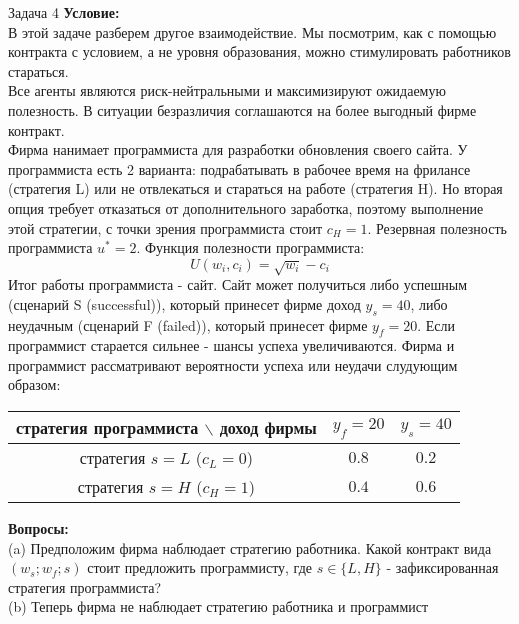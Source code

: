 \begin{mybox}{Задача 4}
    \indent\setlength{\parindent}{1em}\textbf{Условие:}\\
    \indent\setlength{\parindent}{1em}В этой задаче разберем другое взаимодействие. Мы посмотрим, как с помощью контракта с условием, а не уровня
    образования, можно стимулировать работников стараться.\\
    \indent\setlength{\parindent}{1em}Все агенты являются риск-нейтральными и максимизируют ожидаемую полезность. В ситуации безразличия соглашаются на
    более выгодный фирме контракт.\\
    \indent\setlength{\parindent}{1em}Фирма нанимает программиста для разработки обновления своего сайта. У
    программиста есть 2 варианта: подрабатывать в
    рабочее время на фрилансе (стратегия L) или не отвлекаться и стараться на работе (стратегия H). Но вторая опция
    требует отказаться от дополнительного заработка, поэтому выполнение этой стратегии, с точки зрения программиста
    стоит $c_H=1$. Резервная полезность программиста $u^*=2$. Функция полезности программиста: $$U(w_i,c_i)=\sqrt{w_i}
    -c_i$$
    \indent\setlength{\parindent}{1em}Итог работы программиста - сайт. Сайт может получиться либо успешным (сценарий S (successful)), который принесет
    фирме доход $y_s=40$, либо неудачным (сценарий F (failed)), который принесет фирме $y_f=20$. Если программист
    старается сильнее - шансы успеха увеличиваются. Фирма и программист рассматривают вероятности успеха или неудачи слудующим образом:
    \\\begin{center}
    \begin{tabular}{ c|c|c }
     стратегия программиста $\backslash$ доход фирмы & $y_f=20$ & $y_s=40$ \\
     \hline
     стратегия $s=L$ ($c_L=0$) & $0.8$ & $0.2$ \\
     \hline
     стратегия $s=H$ ($c_H=1$) & $0.4$ & $0.6$ \\
    \end{tabular}
    \end{center}
    \indent\setlength{\parindent}{1em}\textbf{Вопросы:}\\
    \indent\setlength{\parindent}{1em}(a) Предположим фирма наблюдает стратегию работника. Какой
    контракт вида $(w_s;w_f;s)$ стоит предложить программисту, где $s\in\{L,H\}$ - зафиксированная стратегия
    программиста?\\
    \indent\setlength{\parindent}{1em}(b) Теперь фирма не наблюдает стратегию работника и программист

\end{mybox}
